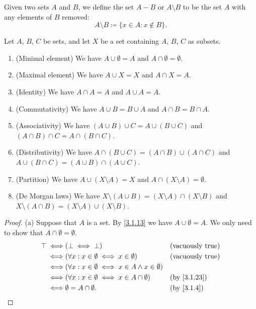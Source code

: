 \setcounter{thm}{26}
\begin{defn}\label{3.1.27}
  Given two sets \(A\) and \(B\), we define the set \(A - B\) or \(A \setminus B\) to be the set \(A\) with any elements of \(B\) removed:
  \[
    A \setminus B \coloneqq \{x \in A : x \notin B\}.
  \]
\end{defn}

\begin{prop}\label{3.1.28}
  Let \(A\), \(B\), \(C\) be sets, and let \(X\) be a set containing \(A\), \(B\), \(C\) as subsets.
  \begin{enumerate}
    \item (Minimal element) We have \(A \cup \emptyset = A\) and \(A \cap \emptyset = \emptyset\).
    \item (Maximal element) We have \(A \cup X = X\) and \(A \cap X = A\).
    \item (Identity) We have \(A \cap A = A\) and \(A \cup A = A\).
    \item (Commutativity) We have \(A \cup B = B \cup A\) and \(A \cap B = B \cap A\).
    \item (Associativity) We have \((A \cup B) \cup C = A \cup (B \cup C)\) and \((A \cap B) \cap C = A \cap (B \cap C)\).
    \item (Distributivity) We have \(A \cap (B \cup C) = (A \cap B) \cup (A \cap C)\) and \(A \cup (B \cap C) = (A \cup B) \cap (A \cup C)\).
    \item (Partition) We have \(A \cup (X \setminus A) = X\) and \(A \cap (X \setminus A) = \emptyset\).
    \item (De Morgan laws) We have \(X \setminus (A \cup B) = (X \setminus A) \cap (X \setminus B)\) and \(X \setminus (A \cap B) = (X \setminus A) \cup (X \setminus B)\).
  \end{enumerate}
\end{prop}

\begin{proof}{(a)}
  Suppose that \(A\) is a set.
  By \cref{3.1.13} we have \(A \cup \emptyset = A\).
  We only need to show that \(A \cap \emptyset = \emptyset\).
  \begin{align*}
    \top \iff & (\bot \iff \bot)                                                 &  & \text{(vacuously true)}   \\
    \iff      & (\forall x : x \in \emptyset \iff x \in \emptyset)               &  & \text{(vacuously true)}   \\
    \iff      & (\forall x : x \in \emptyset \iff x \in A \land x \in \emptyset)                                \\
    \iff      & (\forall x : x \in \emptyset \iff x \in A \cap \emptyset)        &  & \text{(by \cref{3.1.23})} \\
    \iff      & \emptyset = A \cap \emptyset.                                    &  & \text{(by \cref{3.1.4})}
  \end{align*}
\end{proof}

